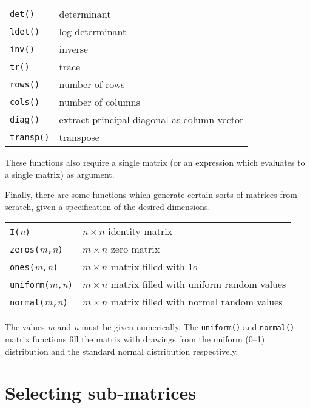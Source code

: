 \begin{center}
\begin{tabular}{ll}
\texttt{det()} & determinant \\
\texttt{ldet()} & log-determinant \\
\texttt{inv()} & inverse \\
\texttt{tr()} & trace \\
\texttt{rows()} & number of rows \\
\texttt{cols()} & number of columns \\
\texttt{diag()} & extract principal diagonal as column vector \\
\texttt{transp()} & transpose 
\end{tabular}
\end{center}

These functions also require a single matrix (or an expression which
evaluates to a single matrix) as argument.

Finally, there are some functions which generate certain sorts of
matrices from scratch, given a specification of the desired
dimensions.

\begin{center}
\begin{tabular}{ll}
\texttt{I(}\textsl{n}\texttt{)} & $n\times n$ identity matrix \\
\texttt{zeros(}\textsl{m}\texttt{,}\textsl{n}\texttt{)} & 
   $m\times n$ zero matrix \\
\texttt{ones(}\textsl{m}\texttt{,}\textsl{n}\texttt{)} &
   $m\times n$ matrix filled with 1s \\
\texttt{uniform(}\textsl{m}\texttt{,}\textsl{n}\texttt{)} &
   $m\times n$ matrix filled with uniform random values \\
\texttt{normal(}\textsl{m}\texttt{,}\textsl{n}\texttt{)} &
   $m\times n$ matrix filled with normal random values \\
\end{tabular}
\end{center}

The values \textsl{m} and \textsl{n} must be given numerically.  The
\texttt{uniform()} and \texttt{normal()} matrix functions fill the
matrix with drawings from the uniform (0--1) distribution and the
standard normal distribution respectively.

\section{Selecting sub-matrices}
\label{matrix-sub}

